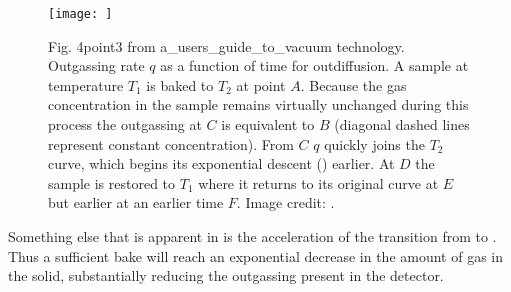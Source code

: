 \begin{figure}
\centering
\texttt{[image: ]}
\caption{Fig. 4point3 from a_users_guide_to_vacuum technology.  Outgassing rate $q$ as a function of time for outdiffusion.  A sample
at temperature $T_1$ is baked to $T_2$ at point $A$.  Because the gas concentration in the sample remains virtually unchanged during this
process the outgassing at $C$ is equivalent to $B$ (diagonal dashed lines represent constant concentration).  From $C$ $q$ quickly
joins the $T_2$ curve, which begins its exponential descent () earlier.  At
$D$ the sample is restored to $T_1$ where it returns to its original curve at $E$ but earlier at an earlier time $F$.  Image
credit: .}
\label{fig:electron_lifetime_model_outgassing_sources_diffusion_rate}
\end{figure}

Something else that is apparent in  is the acceleration of the
transition from  to
.  Thus a sufficient bake will reach an exponential decrease in the amount
of gas in the solid, substantially reducing the outgassing present in the detector.

\begin{table}
\centering
{}
\caption{Outgassing rates of \htwoo, , , and  from 316L stainless steel after various treatments.  Significant
reductions from bakeouts can be seen.  Before treatment each samble was subjected to a two-hour degreasing with perchlorethylene vapor at
$125^{\circ}\mathrm{C}$, followed by a one-hour ultrasonic washing at $55^{\circ}\mathrm{C}$, and finally were rinsed with clean water and
dried.  Data is taken from .}
\label{tab:electron_lifetime_model_outgassing_treatment_rates}
\end{table}


